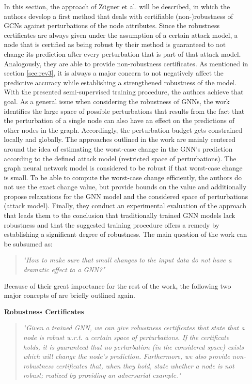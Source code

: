 \documentclass[a4paper,preprint]{sig-alternate}
\begin{document}
In this section, the approach of Zügner et al. \cite{Zuegner_2019} will be described,
in which the authors develop a first method that deals with certifiable (non-)robustness of GCNs against perturbations of
the node attributes. Since the robustness certificates are always given under the assumption of a certain attack model,
a node that is certified as being robust by their method is guaranteed to not change its prediction after every perturbation that is
part of that attack model. Analogously, they are able to provide non-robustness certificates.
As mentioned in section \ref{sec:rev3}, it is always a major concern to not negatively affect the predictive accuracy 
while establishing a strengthened robustness of the model. With the presented semi-supervised training procedure, the authors achieve that goal.
As a general issue when considering the robustness of GNNs, the work identifies the large space of possible perturbations
that results from the fact that the perturbation of a single node can also have an effect on the predictions of other nodes in the graph.
Accordingly, the perturbation budget gets constrained locally and globally.
The approaches outlined in the work are mainly centered around the idea of estimating the worst-case change in the GNN's prediction according
to the defined attack model (restricted space of perturbations). The graph neural network model is considered to be robust
if that worst-case change is small.
To be able to compute the worst-case change efficiently, the authors do not use the exact change value, but provide bounds on the value
and additionally propose relaxations for the GNN model and the considered space of perturbations (attack model). 
Finally, they conduct an experimental evaluation of the approach that leads them to the conclusion that 
traditionally trained GNN models lack robustness and that the suggested training procedure offers a remedy by establishing
a significant degree of robustness. The main question of the work can be subsumed as:
\begin{quote}
    \emph{"How to make sure that small changes to the input data do not have a dramatic effect to a GNN?"} \cite{Zuegner_2019}
\end{quote}

Because of their great importance for the rest of the work, the following two major concepts of \cite{Zuegner_2019} are briefly 
outlined again.\newline

\textbf{Robustness Certificates}
\begin{quote}
    \emph{"Given a trained GNN, we can give robustness certificates that state that a node is robust w.r.t. a certain space of perturbations. 
    If the certificate holds, it is guaranteed that no perturbation (in the considered space) exists which will change the node's prediction. 
    Furthermore, we also provide non-robustness certificates that, when they hold, state whether a node is not robust; realized by providing 
    an adversarial example."} \cite{Zuegner_2019}
\end{quote}
\end{document}
